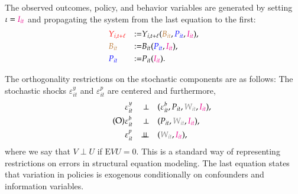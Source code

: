 \documentclass[9pt,twoside,lineno]{pnas-new}
\theoremstyle{definition}
\newcommand\indep{\protect\mathpalette{\protect\independenT}{\perp}}
\def\independenT#1#2{\mathrel{\setbox0\hbox{$#1#2$}%
    \copy0\kern-\wd0\mkern4mu\box0}}
\newcommand{\Ep}{{\mathrm{E}}}
\renewcommand{\indep}{\perp \!\!\! \perp}
\def\bcolor{\color{brown}}
\def\pcolor{\color{blue}}
\def\icolor{\color{magenta}}
\def\wcolor{\color{gray}}
\def\ycolor{\color{red}}
\begin{document}
The observed outcomes, policy, and behavior variables are generated by setting $\iota= {\icolor I_{it}}$ and propagating
the system from the last equation to the first:
\[
  \begin{aligned}
& {\ycolor Y_{i,t+\ell}}  & := & Y_{i,t+\ell} ( {\bcolor B_{it} } ,{\pcolor P_{it}}, {\icolor I_{it}}), \\
& {\bcolor B_{it} } & := &   B_{it}({\pcolor P_{it} } ,{\icolor I_{it}}), \\
& {\pcolor P_{it} }& := &  P_{it}({\icolor I_{it}}). \end{aligned}
\]


The orthogonality restrictions on the stochastic components are as follows: The stochastic shocks $\varepsilon^y_{it}$
and  $\varepsilon^p_{it}$ are centered and furthermore,
\begin{equation}\label{eqn:SEM2} \tag{O}
\begin{aligned}
   & \varepsilon^y_{it} &  \perp &  \quad (\varepsilon^b_{it}, P_{it}, {\wcolor W_{it}}, {\icolor I_{it}}), \\
&  \varepsilon^b_{it}  & \perp & \quad  (P_{it}, {\wcolor W_{it}}, {\icolor I_{it}}), \\
&   \varepsilon^p_{it} &  \indep &  \quad ({\wcolor W_{it}}, {\icolor I_{it}}),
\end{aligned}
\end{equation}
where we say that $V \perp U$ if $\Ep VU = 0$. This is a standard way of representing restrictions on errors in structural equation modeling. The last equation states that variation in policies is exogenous conditionally on confounders and information variables.

\end{document}
